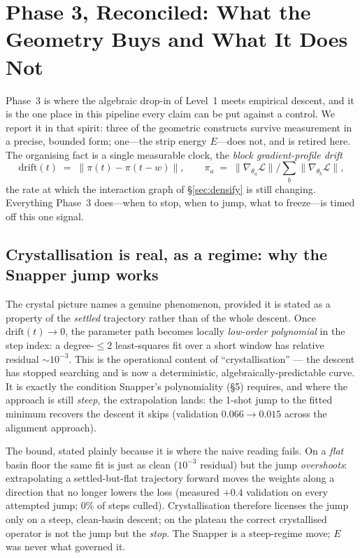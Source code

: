 \section{Phase 3, Reconciled: What the Geometry Buys and What It Does Not}
\label{sec:phase3reconciled}
Phase~3 is where the algebraic drop-in of Level~1 meets empirical descent, and
it is the one place in this pipeline every claim can be put against a control.
We report it in that spirit: three of the geometric constructs survive
measurement in a precise, bounded form; one---the strip energy $E$---does not,
and is retired here. The organising fact is a single measurable clock, the
\emph{block gradient-profile drift}
\[
  \mathrm{drift}(t) \;=\; \bigl\| \pi(t) - \pi(t-w) \bigr\|, \qquad
  \pi_a \;=\; \lVert \nabla_{\theta_a}\mathcal{L}\rVert \big/ \textstyle\sum_b \lVert \nabla_{\theta_b}\mathcal{L}\rVert,
\]
the rate at which the interaction graph of \S\ref{sec:densify} is still changing.
Everything Phase~3 does---when to stop, when to jump, what to freeze---is timed
off this one signal.

\subsection{Crystallisation is real, as a regime: why the Snapper jump works}
The crystal picture names a genuine phenomenon, provided it is stated as a
property of the \emph{settled} trajectory rather than of the whole descent. Once
$\mathrm{drift}(t)\to 0$, the parameter path becomes locally
\emph{low-order polynomial} in the step index: a degree-$\le 2$ least-squares fit
over a short window has relative residual $\sim 10^{-3}$. This is the operational
content of ``crystallisation'' --- the descent has stopped searching and is now
a deterministic, algebraically-predictable curve. It is exactly the condition
Snapper's polynomiality (\S5) requires, and where the approach is still
\emph{steep}, the extrapolation lands: the 1-shot jump to the fitted minimum
recovers the descent it skips (validation $0.066 \to 0.015$ across the alignment
approach).

The bound, stated plainly because it is where the naive reading fails. On a
\emph{flat} basin floor the same fit is just as clean ($10^{-3}$ residual) but the
jump \emph{overshoots}: extrapolating a settled-but-flat trajectory forward moves
the weights along a direction that no longer lowers the loss (measured $+0.4$
validation on every attempted jump; $0\%$ of steps culled). Crystallisation
therefore licenses the jump only on a steep, clean-basin descent; on the plateau
the correct crystallised operator is not the jump but the \emph{stop}. The
Snapper is a steep-regime move; $E$ was never what governed it.

